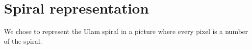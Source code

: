 \newpage\cleardoublepage{}
\section{Spiral representation}
We chose to represent the Ulam spiral in a picture where every pixel is a number of the spiral.
